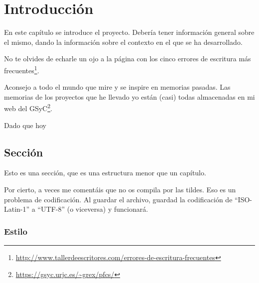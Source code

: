 \documentclass[a4paper, 12pt]{book}
\begin{document}
\tableofcontents 
\cleardoublepage
\listoffigures %



\cleardoublepage
\chapter{Introducción}
\label{sec:intro} %

En este capítulo se introduce el proyecto.
Debería tener información general sobre el mismo, dando la información sobre el contexto en el que se ha desarrollado.

No te olvides de echarle un ojo a la página con los cinco errores de escritura más frecuentes\footnote{\url{http://www.tallerdeescritores.com/errores-de-escritura-frecuentes}}.

Aconsejo a todo el mundo que mire y se inspire en memorias pasadas.
Las memorias de los proyectos que he llevado yo están (casi) todas almacenadas en mi web del GSyC\footnote{\url{https://gsyc.urjc.es/~grex/pfcs/}}.

Dado que hoy 

\section{Sección}
\label{sec:seccion}

Esto es una sección, que es una estructura menor que un capítulo. 

Por cierto, a veces me comentáis que no os compila por las tildes.
Eso es un problema de codificación.
Al guardar el archivo, guardad la codificación de ``ISO-Latin-1'' a ``UTF-8'' (o viceversa) y funcionará.

\subsection{Estilo}
\label{subsec:estilo}
\end{document}
